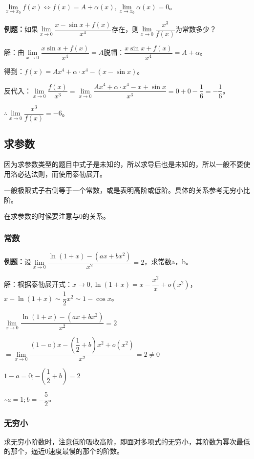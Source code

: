 $\lim\limits_{x\to x_0}f(x)\Leftrightarrow f(x)=A+\alpha(x),\lim\limits_{x\to x_0}\alpha(x)=0$。

\textbf{例题：}如果$\lim\limits_{x\to 0}\dfrac{x-\sin x+f(x)}{x^4}$存在，则$\lim\limits_{x\to 0}\dfrac{x^3}{f(x)}$为常数多少？

解：由$\lim\limits_{x\to 0}\dfrac{x\sin x+f(x)}{x^4}=A$脱帽：$\dfrac{x\sin x+f(x)}{x^4}=A+\alpha$。

得到：$f(x)=Ax^4+\alpha\cdot x^4-(x-\sin x)$。

反代入：$\lim\limits_{x\to 0}\dfrac{f(x)}{x^3}=\lim\limits_{x\to 0}\dfrac{Ax^4+\alpha\cdot x^4-x+\sin x}{x^3}=0+0-\dfrac{1}{6}=-\dfrac{1}{6}$。

$\therefore \lim\limits_{x\to 0}\dfrac{x^3}{f(x)}=-6$。

\subsection{求参数}

因为求参数类型的题目中式子是未知的，所以求导后也是未知的，所以一般不要使用洛必达法则，而使用泰勒展开。

一般极限式子右侧等于一个常数，或是表明高阶或低阶。具体的关系参考无穷小比阶。

在求参数的时候要注意与0的关系。

\subsubsection{常数}

\textbf{例题：}设$\lim\limits_{x\to 0}\dfrac{\ln(1+x)-(ax+bx^2)}{x^2}=2$，求常数a，b。

解：根据泰勒展开式：$x\to 0,\ln(1+x)=x-\dfrac{x^2}{x}+o(x^2)$，$x-\ln(1+x)\sim\dfrac{1}{2}x^2\sim 1-\cos x$。

$\lim\limits_{x\to 0}\dfrac{\ln(1+x)-(ax+bx^2)}{x^2}=2$

$=\lim\limits_{x\to 0}\dfrac{(1-a)x-\left(\dfrac{1}{2}+b\right)x^2+o(x^2)}{x^2}=2\neq 0$

$1-a=0;-\left(\dfrac{1}{2}+b\right)=2$\medskip

$\therefore a=1;b=-\dfrac{5}{2}$。

\subsubsection{无穷小}

求无穷小阶数时，注意低阶吸收高阶，即面对多项式的无穷小，其阶数为幂次最低的那个，逼近0速度最慢的那个的阶数。

